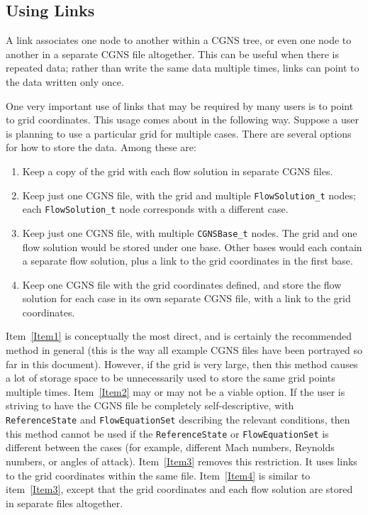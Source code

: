 \documentclass[12pt]{article}
\begin{document}
\subsection{Using Links} \label{sec:links}

A link associates one node to another within a CGNS tree, or even one node
to another in a separate CGNS file altogether.  This can be useful when
there is repeated data; rather than write the same data multiple times,
links can point to the data written only once.

One very important use of links that may be required by many
users is to point to grid coordinates.
This usage comes about in the following way.  Suppose
a user is planning to use a particular grid for multiple cases.  There
are several options for how to store the data.  Among these are:

\begin{enumerate}
\item Keep a copy of the grid with each flow solution in separate CGNS files. \label{Item1}
\item Keep just one CGNS file, with the grid and multiple {\tt FlowSolution\_t}
nodes; each {\tt FlowSolution\_t} node corresponds with a different case. \label{Item2}
\item Keep just one CGNS file, with multiple {\tt CGNSBase\_t} nodes.  The
grid and one flow solution would be stored under one base.
Other bases would each contain a separate flow solution, plus a link
to the grid coordinates in the first base. \label{Item3}
\item Keep one CGNS file with the grid coordinates defined, and store
the flow solution for each case in its own separate CGNS file, with a 
link to the grid coordinates. \label{Item4}
\end{enumerate}

Item~\ref{Item1} is conceptually the most direct, and is certainly the recommended method
in general (this is the way all example CGNS files have been portrayed
so far in this document).  However, if the grid is very large, then this method causes a
lot of storage space to be unnecessarily used to store the same grid
points multiple times.  Item~\ref{Item2} may or may not be a viable option.
If the user is striving to have the CGNS file be completely self-descriptive,
with {\tt ReferenceState} and {\tt FlowEquationSet} 
describing the relevant conditions, then this method
cannot be used if the {\tt ReferenceState} or {\tt FlowEquationSet}
is different between the cases (for example, different Mach numbers,
Reynolds numbers, or angles of attack).
Item~\ref{Item3} removes this restriction.  It uses links to the grid coordinates
within the same file.  
Item~\ref{Item4} is similar to item~\ref{Item3}, except
that the grid coordinates and each flow solution are stored in separate files altogether.
\end{document}
